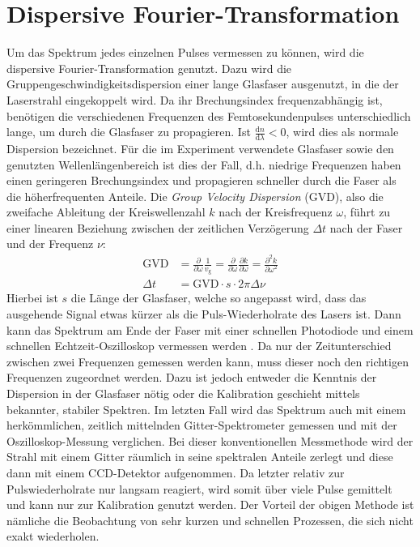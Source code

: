 \documentclass[bachelor,       %
               twoside,        %
               BCOR10mm,       %
               liststotoc,nomtotoc,bibtotoc, %
               english,ngerman, %
               final,          %
               ]{GAUBM}
\newcommand{\dif}{\ensuremath{\mathrm{d}}}
\begin{document}
\section{Dispersive Fourier-Transformation}
\label{sec:DFT}
Um das Spektrum jedes einzelnen Pulses vermessen zu können, wird die dispersive Fourier-Transformation genutzt.
Dazu wird die Gruppengeschwindigkeitsdispersion einer lange Glasfaser ausgenutzt, in die der Laserstrahl eingekoppelt wird.
Da ihr Brechungsindex frequenzabhängig ist, benötigen die verschiedenen Frequenzen des Femtosekundenpulses unterschiedlich lange, um durch die Glasfaser zu propagieren.
Ist $\frac{\dif n}{\dif \lambda}<0$, wird dies als normale Dispersion bezeichnet.
Für die im Experiment verwendete Glasfaser sowie den genutzten Wellenlängenbereich ist dies der Fall, d.h. niedrige Frequenzen haben einen geringeren Brechungsindex und propagieren schneller durch die Faser als die höherfrequenten Anteile.
Die \textit{Group Velocity Dispersion} (GVD), also die zweifache Ableitung der Kreiswellenzahl $k$ nach der Kreisfrequenz $\omega$, führt zu einer linearen Beziehung zwischen der zeitlichen Verzögerung $\Delta t$ nach der Faser und der Frequenz $\nu$:
\begin{align}
	\text{GVD}&=\frac{\partial}{\partial \omega}\frac{1}{v_\text{g}}=\frac{\partial}{\partial \omega}\frac{\partial k}{\partial \omega}=\frac{\partial^2 k}{\partial\omega^2}\\
	\Delta t&=\text{GVD} \cdot s \cdot 2\pi\Delta\nu
\end{align}
Hierbei ist $s$ die Länge der Glasfaser, welche so angepasst wird, dass das ausgehende Signal etwas kürzer als die Puls-Wiederholrate des Lasers ist.
Dann kann das Spektrum am Ende der Faser mit einer schnellen Photodiode und einem schnellen Echtzeit-Oszilloskop vermessen werden \cite{goda_dispersive_2013}.
Da nur der Zeitunterschied zwischen zwei Frequenzen gemessen werden kann, muss dieser noch den richtigen Frequenzen zugeordnet werden.
Dazu ist jedoch entweder die Kenntnis der Dispersion in der Glasfaser nötig oder die Kalibration geschieht mittels bekannter, stabiler Spektren.
Im letzten Fall wird das Spektrum auch mit einem herkömmlichen, zeitlich mittelnden Gitter-Spektrometer gemessen und mit der Oszilloskop-Messung verglichen.
Bei dieser konventionellen Messmethode wird der Strahl mit einem Gitter räumlich in seine spektralen Anteile zerlegt und diese dann mit einem CCD-Detektor aufgenommen.
Da letzter relativ zur Pulswiederholrate nur langsam reagiert, wird somit über viele Pulse gemittelt und kann nur zur Kalibration genutzt werden.
Der Vorteil der obigen Methode ist nämliche die Beobachtung von sehr kurzen und schnellen Prozessen, die sich nicht exakt wiederholen.
\end{document}
